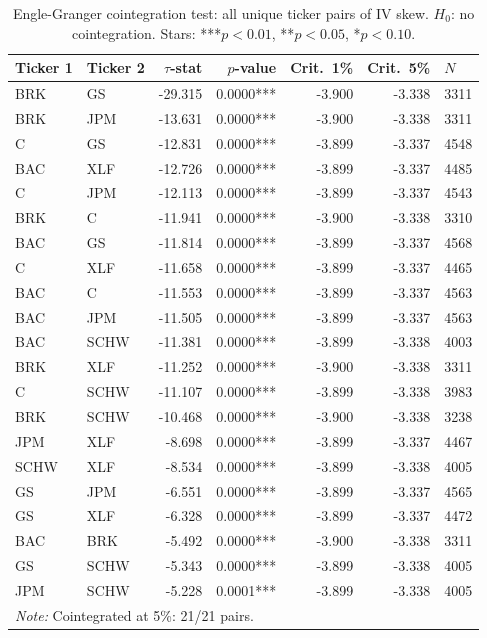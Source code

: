 \documentclass[12pt, a4paper]{article}
\begin{document}
\begin{table}[h]
\centering
\small
\caption{Engle-Granger cointegration test: all unique ticker pairs of IV skew. $H_0$: no cointegration. Stars: ***$p<0.01$, **$p<0.05$, *$p<0.10$.}
\label{tab:coint_pairs_engle_granger}
\begin{tabular}{llrrrrl}
\toprule
Ticker 1 & Ticker 2 & $\tau$-stat & $p$-value & Crit.\ 1\% & Crit.\ 5\% & $N$ \\
\midrule
BRK & GS & -29.315 & 0.0000*** & -3.900 & -3.338 & 3311 \\
BRK & JPM & -13.631 & 0.0000*** & -3.900 & -3.338 & 3311 \\
C & GS & -12.831 & 0.0000*** & -3.899 & -3.337 & 4548 \\
BAC & XLF & -12.726 & 0.0000*** & -3.899 & -3.337 & 4485 \\
C & JPM & -12.113 & 0.0000*** & -3.899 & -3.337 & 4543 \\
BRK & C & -11.941 & 0.0000*** & -3.900 & -3.338 & 3310 \\
BAC & GS & -11.814 & 0.0000*** & -3.899 & -3.337 & 4568 \\
C & XLF & -11.658 & 0.0000*** & -3.899 & -3.337 & 4465 \\
BAC & C & -11.553 & 0.0000*** & -3.899 & -3.337 & 4563 \\
BAC & JPM & -11.505 & 0.0000*** & -3.899 & -3.337 & 4563 \\
BAC & SCHW & -11.381 & 0.0000*** & -3.899 & -3.338 & 4003 \\
BRK & XLF & -11.252 & 0.0000*** & -3.900 & -3.338 & 3311 \\
C & SCHW & -11.107 & 0.0000*** & -3.899 & -3.338 & 3983 \\
BRK & SCHW & -10.468 & 0.0000*** & -3.900 & -3.338 & 3238 \\
JPM & XLF & -8.698 & 0.0000*** & -3.899 & -3.337 & 4467 \\
SCHW & XLF & -8.534 & 0.0000*** & -3.899 & -3.338 & 4005 \\
GS & JPM & -6.551 & 0.0000*** & -3.899 & -3.337 & 4565 \\
GS & XLF & -6.328 & 0.0000*** & -3.899 & -3.337 & 4472 \\
BAC & BRK & -5.492 & 0.0000*** & -3.900 & -3.338 & 3311 \\
GS & SCHW & -5.343 & 0.0000*** & -3.899 & -3.338 & 4005 \\
JPM & SCHW & -5.228 & 0.0001*** & -3.899 & -3.338 & 4005 \\
\bottomrule
\multicolumn{7}{l}{\textit{Note: } Cointegrated at 5\%: 21/21 pairs.} \\
\end{tabular}
\end{table}
\end{document}
